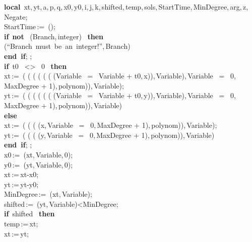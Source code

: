 \documentclass{article}
\begin{document}
\begin{maplelatex}
\begin{center}
\begin{maplelatex}
\begin{center}
{\textbf{local} \,xt,\,yt,\,a,\,p,\,q,\,x0,\,y0,\,i,\,j,\,k,\,shifted,\,temp,\,sols,\,StartTime,\,MinDegree,\,arg,\,z,\,Negate; \\
 StartTime\,:=\, ();\\
 \textbf{if} \,\textbf{not} \, (Branch,\,integer) \, \textbf{then} \\
  (``Branch\ must\ be\ an\ integer!'',\,Branch)\\
 \textbf{end\ if}; ;\\
 \textbf{if} \,t0 \, <> \, 0 \, \textbf{then} \\
 xt\,:=\, ( ( ( ( ( ( (Variable \, = \, Variable + t0,\,x)),\,Variable),\,Variable \, = \, 0,\,MaxDegree + 1),\,polynom)),\,Variable);\\
 yt\,:=\, ( ( ( ( ( ( (Variable \, = \, Variable + t0,\,y)),\,Variable),\,Variable \, = \, 0,\,MaxDegree + 1),\,polynom)),\,Variable)\\
 \textbf{else}\\
 xt\,:=\, ( ( ( (x,\,Variable \, = \, 0,\,MaxDegree + 1),\,polynom)),\,Variable);\\
 yt\,:=\, ( ( ( (y,\,Variable \, = \, 0,\,MaxDegree + 1),\,polynom)),\,Variable)\\
 \textbf{end\ if}; ;\\
 x0\,:=\, (xt,\,Variable,\,0);\\
 y0\,:=\, (yt,\,Variable,\,0);\\
 xt\,:=\,xt-x0;\\
 yt\,:=\,yt-y0;\\
 MinDegree\,:=\, (xt,\,Variable);\\
 shifted\,:=\, (yt,\,Variable)<MinDegree;\\
 \textbf{if} \,shifted \, \textbf{then} \\
 temp\,:=\,xt;\\
 xt\,:=\,yt;\\
}
\end{center}
\end{maplelatex}
\end{center}
\end{maplelatex}
\end{document}
